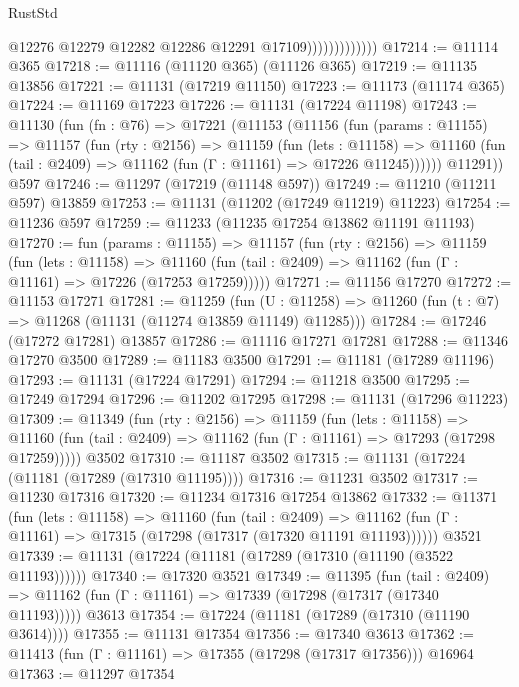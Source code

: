 \begin{lexlean}{RustStd}
\begin{coremodule}
                              @12276
                              @12279
                              @12282
                              @12286
                              @12291
                              @17109)))))))))))))
@17214 := @11114 @365
@17218 := @11116 (@11120 @365) (@11126 @365)
@17219 := @11135 @13856
@17221 := @11131 (@17219 @11150)
@17223 := @11173 (@11174 @365)
@17224 := @11169 @17223
@17226 := @11131 (@17224 @11198)
@17243 := @11130
    (fun (fn : @76) =>
    @17221
      (@11153
        (@11156
          (fun (params : @11155) =>
          @11157
            (fun (rty : @2156) =>
            @11159
              (fun (lets : @11158) =>
              @11160 (fun (tail : @2409) => @11162 (fun (Γ : @11161) => @17226 @11245))))))
        @11291))
    @597
@17246 := @11297 (@17219 (@11148 @597))
@17249 := @11210 (@11211 @597) @13859
@17253 := @11131 (@11202 (@17249 @11219) @11223)
@17254 := @11236 @597
@17259 := @11233 (@11235 @17254 @13862 @11191 @11193)
@17270 := fun (params : @11155) =>
  @11157
    (fun (rty : @2156) =>
    @11159
      (fun (lets : @11158) =>
      @11160 (fun (tail : @2409) => @11162 (fun (Γ : @11161) => @17226 (@17253 @17259)))))
@17271 := @11156 @17270
@17272 := @11153 @17271
@17281 := @11259
    (fun (U : @11258) => @11260 (fun (t : @7) => @11268 (@11131 (@11274 @13859 @11149) @11285)))
@17284 := @17246 (@17272 @17281) @13857
@17286 := @11116 @17271 @17281
@17288 := @11346 @17270 @3500
@17289 := @11183 @3500
@17291 := @11181 (@17289 @11196)
@17293 := @11131 (@17224 @17291)
@17294 := @11218 @3500
@17295 := @17249 @17294
@17296 := @11202 @17295
@17298 := @11131 (@17296 @11223)
@17309 := @11349
    (fun (rty : @2156) =>
    @11159
      (fun (lets : @11158) =>
      @11160 (fun (tail : @2409) => @11162 (fun (Γ : @11161) => @17293 (@17298 @17259)))))
    @3502
@17310 := @11187 @3502
@17315 := @11131 (@17224 (@11181 (@17289 (@17310 @11195))))
@17316 := @11231 @3502
@17317 := @11230 @17316
@17320 := @11234 @17316 @17254 @13862
@17332 := @11371
    (fun (lets : @11158) =>
    @11160
      (fun (tail : @2409) =>
      @11162 (fun (Γ : @11161) => @17315 (@17298 (@17317 (@17320 @11191 @11193))))))
    @3521
@17339 := @11131 (@17224 (@11181 (@17289 (@17310 (@11190 (@3522 @11193))))))
@17340 := @17320 @3521
@17349 := @11395
    (fun (tail : @2409) => @11162 (fun (Γ : @11161) => @17339 (@17298 (@17317 (@17340 @11193)))))
    @3613
@17354 := @17224 (@11181 (@17289 (@17310 (@11190 @3614))))
@17355 := @11131 @17354
@17356 := @17340 @3613
@17362 := @11413 (fun (Γ : @11161) => @17355 (@17298 (@17317 @17356))) @16964
@17363 := @11297 @17354

\end{coremodule}
\end{lexlean}
